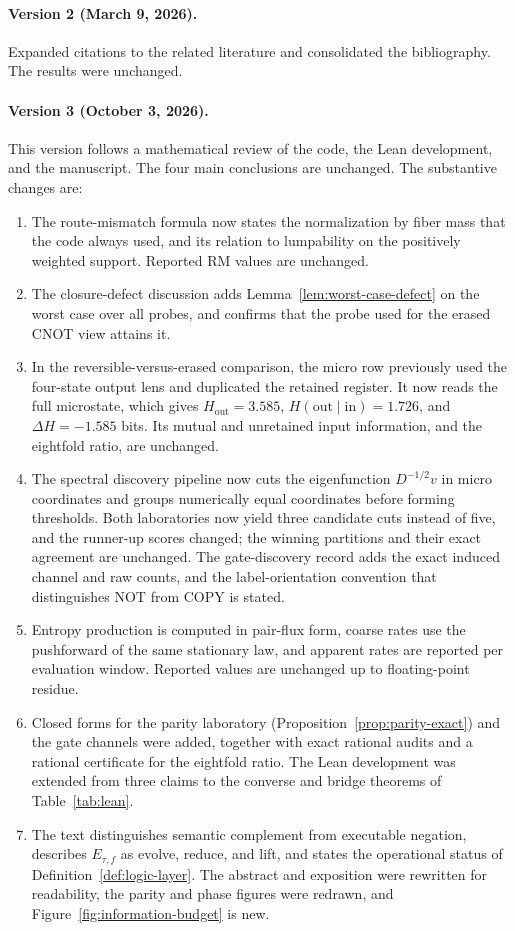 \paragraph{Version 2 (March 9, 2026).} Expanded citations to the related literature and consolidated the bibliography. The results were unchanged.

\paragraph{Version 3 (October 3, 2026).} This version follows a mathematical review of the code, the Lean development, and the manuscript. The four main conclusions are unchanged. The substantive changes are:
\begin{enumerate}
    \item The route-mismatch formula now states the normalization by fiber mass that the code always used, and its relation to lumpability on the positively weighted support. Reported RM values are unchanged.
    \item The closure-defect discussion adds Lemma~\ref{lem:worst-case-defect} on the worst case over all probes, and confirms that the probe used for the erased CNOT view attains it.
    \item In the reversible-versus-erased comparison, the micro row previously used the four-state output lens and duplicated the retained register. It now reads the full microstate, which gives \(H_{\mathrm{out}}=3.585\), \(H(\mathrm{out}\mid\mathrm{in})=1.726\), and \(\Delta H=-1.585\) bits. Its mutual and unretained input information, and the eightfold ratio, are unchanged.
    \item The spectral discovery pipeline now cuts the eigenfunction \(D^{-1/2}v\) in micro coordinates and groups numerically equal coordinates before forming thresholds. Both laboratories now yield three candidate cuts instead of five, and the runner-up scores changed; the winning partitions and their exact agreement are unchanged. The gate-discovery record adds the exact induced channel and raw counts, and the label-orientation convention that distinguishes NOT from COPY is stated.
    \item Entropy production is computed in pair-flux form, coarse rates use the pushforward of the same stationary law, and apparent rates are reported per evaluation window. Reported values are unchanged up to floating-point residue.
    \item Closed forms for the parity laboratory (Proposition~\ref{prop:parity-exact}) and the gate channels were added, together with exact rational audits and a rational certificate for the eightfold ratio. The Lean development was extended from three claims to the converse and bridge theorems of Table~\ref{tab:lean}.
    \item The text distinguishes semantic complement from executable negation, describes \(E_{\tau,f}\) as evolve, reduce, and lift, and states the operational status of Definition~\ref{def:logic-layer}. The abstract and exposition were rewritten for readability, the parity and phase figures were redrawn, and Figure~\ref{fig:information-budget} is new.
\end{enumerate}



